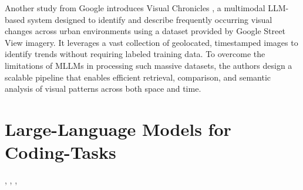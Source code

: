 Another study from Google introduces Visual Chronicles \cite{Deng2025VisualChronicles}, a multimodal LLM-based system designed to identify and describe frequently occurring visual changes across urban environments using a dataset provided by Google Street View imagery. It leverages a vast collection of geolocated, timestamped images to identify trends without requiring labeled training data. To overcome the limitations of MLLMs in processing such massive datasets, the authors design a scalable pipeline that enables efficient retrieval, comparison, and semantic analysis of visual patterns across both space and time.



\section{Large-Language Models for Coding-Tasks}


\cite{Seed2025SeedCoder}, \cite{Ahmad2025OCRNVidia}, \cite{Hui2024Qwen25Coder}, \cite{Roziere2024CodeLlama}      %


\cite{Grattafiori2024Llama3}        %


\cite{Dominguez2024BlarSQL}     %
\cite{Li2023BirdSQL}        %
\cite{Lai2022DS1000}   %




